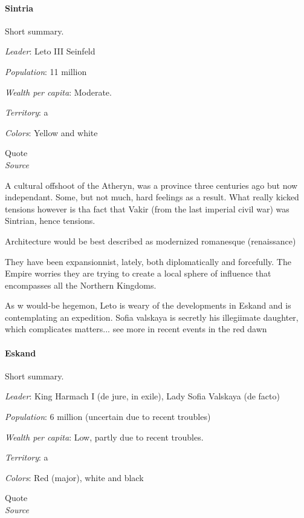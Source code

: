 \paragraph{Sintria}

Short summary.

\textit{Leader}: Leto III Seinfeld

\textit{Population}: 11 million

\textit{Wealth per capita}: Moderate.

\textit{Territory}: a
    
\textit{Colors}: Yellow and white


\begin{rpg-quotebox}
    Quote \\ \textendash \textit{Source}
    \end{rpg-quotebox}


A cultural offshoot of the Atheryn, was a province three centuries ago but now independant. Some, but not much, hard feelings as a result. What really kicked tensions however is tha fact that Vakir (from the last imperial civil war) was Sintrian, hence tensions.

Architecture would be best described as modernized romanesque (renaissance)

They have been expansionnist, lately, both diplomatically and forcefully. The Empire worries they are trying to create a local sphere of influence that encompasses all the Northern Kingdoms.

As w would-be hegemon, Leto is weary of the developments in Eskand and is contemplating an expedition.
Sofia valskaya is secretly his illegiimate daughter, which complicates matters... see more in recent events in the red dawn


\paragraph{Eskand}


Short summary.


\textit{Leader}: King Harmach I (de jure, in exile), Lady Sofia Valskaya (de facto)

\textit{Population}: 6 million (uncertain due to recent troubles)

\textit{Wealth per capita}: Low, partly due to recent troubles.

\textit{Territory}: a
    
\textit{Colors}: Red (major), white and black


\begin{rpg-quotebox}
Quote \\ \textendash \textit{Source}
\end{rpg-quotebox}


